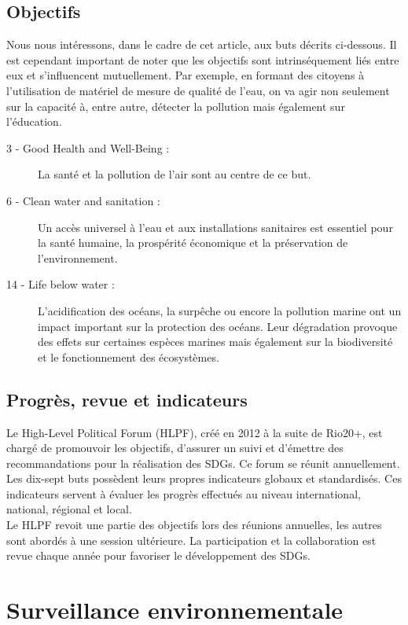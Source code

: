 \documentclass[10pt, article]{llncs}
\begin{document}
		\subsection{Objectifs}
			Nous nous intéressons, dans le cadre de cet article, aux buts décrits ci-dessous. Il est cependant important de noter que les objectifs sont intrinséquement liés entre eux et s'influencent mutuellement. Par exemple, en formant des citoyens à l'utilisation de matériel de mesure de qualité de l'eau, on va agir non seulement sur la capacité à, entre autre, détecter la pollution mais également sur l'éducation.
			\begin{description}
				\item[ 3 - Good Health and Well-Being :] La santé et la pollution de l'air sont au centre de ce but.
				\item[ 6 - Clean water and sanitation :] Un accès universel à l'eau et aux installations sanitaires est essentiel pour la santé humaine, la prospérité économique et la préservation de l'environnement.
				\item[14 - Life below water :] L'acidification des océans, la surpêche ou encore la pollution marine ont un impact important sur la protection des océans. Leur dégradation provoque des effets sur certaines espèces marines mais également sur la biodiversité et le fonctionnement des écosystèmes.
			\end{description}				
		
		\subsection{Progrès, revue et indicateurs}
			Le High-Level Political Forum (HLPF), créé en 2012 à la suite de Rio20+, est chargé de promouvoir les objectifs, d'assurer un suivi et d'émettre des recommandations pour la réalisation des SDGs. Ce forum se réunit annuellement. \\
			Les dix-sept buts possèdent leurs propres indicateurs globaux et standardisés. Ces indicateurs servent à évaluer les progrès effectués au niveau international, national, régional et local. \\
			Le HLPF revoit une partie des objectifs lors des réunions annuelles, les autres sont abordés à une session ultérieure. La participation et la collaboration est revue chaque année pour favoriser le développement des SDGs.

\section{Surveillance environnementale}
\end{document}
